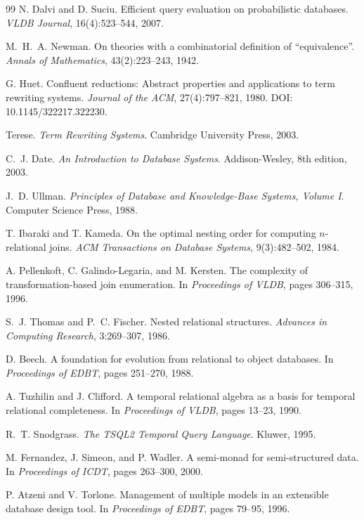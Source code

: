 \documentclass[acmsmall,review,anonymous]{acmart}
\theoremstyle{plain}
\theoremstyle{definition}
\theoremstyle{remark}
\begin{document}
\begin{thebibliography}{99}
N. Dalvi and D. Suciu.
\newblock Efficient query evaluation on probabilistic databases.
\newblock \emph{VLDB Journal}, 16(4):523--544, 2007.

M.~H.~A. Newman.
\newblock On theories with a combinatorial definition of
``equivalence''.
\newblock \emph{Annals of Mathematics}, 43(2):223--243, 1942.

G. Huet.
\newblock Confluent reductions: Abstract properties and applications
to term rewriting systems.
\newblock \emph{Journal of the ACM}, 27(4):797--821, 1980.
\newblock DOI: 10.1145/322217.322230.

Terese.
\newblock \emph{Term Rewriting Systems}.
\newblock Cambridge University Press, 2003.

C.~J. Date.
\newblock \emph{An Introduction to Database Systems}.
\newblock Addison-Wesley, 8th edition, 2003.

J.~D. Ullman.
\newblock \emph{Principles of Database and Knowledge-Base Systems,
Volume I}.
\newblock Computer Science Press, 1988.

T. Ibaraki and T. Kameda.
\newblock On the optimal nesting order for computing $n$-relational
joins.
\newblock \emph{ACM Transactions on Database Systems}, 9(3):482--502,
1984.

A. Pellenkoft, C. Galindo-Legaria, and M. Kersten.
\newblock The complexity of transformation-based join enumeration.
\newblock In \emph{Proceedings of VLDB}, pages 306--315, 1996.

S.~J. Thomas and P.~C. Fischer.
\newblock Nested relational structures.
\newblock \emph{Advances in Computing Research}, 3:269--307, 1986.

D. Beech.
\newblock A foundation for evolution from relational to object
databases.
\newblock In \emph{Proceedings of EDBT}, pages 251--270, 1988.

A. Tuzhilin and J. Clifford.
\newblock A temporal relational algebra as a basis for temporal
relational completeness.
\newblock In \emph{Proceedings of VLDB}, pages 13--23, 1990.

R.~T. Snodgrass.
\newblock \emph{The TSQL2 Temporal Query Language}.
\newblock Kluwer, 1995.

M. Fernandez, J. Simeon, and P. Wadler.
\newblock A semi-monad for semi-structured data.
\newblock In \emph{Proceedings of ICDT}, pages 263--300, 2000.

P. Atzeni and V. Torlone.
\newblock Management of multiple models in an extensible database
design tool.
\newblock In \emph{Proceedings of EDBT}, pages 79--95, 1996.

\end{thebibliography}
\end{document}
